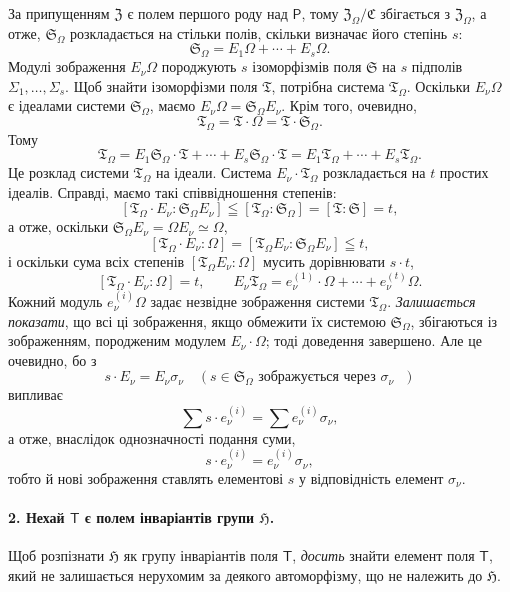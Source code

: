 \documentclass[11pt]{article}
\begin{document}
За припущенням \(\mathfrak Z\) є полем першого роду над \(\mathsf P\), тому \(\mathfrak Z_\Omega/\mathfrak C\) збігається з \(\mathfrak Z_\Omega\), а отже, \(\mathfrak S_\Omega\) розкладається на стільки полів, скільки визначає його степінь \(s\):
\[
\mathfrak S_\Omega = E_1\Omega+\cdots+E_s\Omega .
\]
Модулі зображення \(E_\nu\Omega\) породжують \(s\) ізоморфізмів поля \(\mathfrak S\) на \(s\) підполів \(\Sigma_1,\ldots,\Sigma_s\). Щоб знайти ізоморфізми поля \(\mathfrak T\), потрібна система \(\mathfrak T_\Omega\). Оскільки \(E_\nu\Omega\) є ідеалами системи \(\mathfrak S_\Omega\), маємо \(E_\nu\Omega=\mathfrak S_\Omega E_\nu\). Крім того, очевидно,
\[
\mathfrak T_\Omega=\mathfrak T\cdot\Omega=\mathfrak T\cdot\mathfrak S_\Omega .
\]
Тому
\[
\mathfrak T_\Omega
=E_1\mathfrak S_\Omega\cdot\mathfrak T+\cdots+E_s\mathfrak S_\Omega\cdot\mathfrak T
=E_1\mathfrak T_\Omega+\cdots+E_s\mathfrak T_\Omega .
\]
Це розклад системи \(\mathfrak T_\Omega\) на ідеали. Система \(E_\nu\cdot\mathfrak T_\Omega\) розкладається на \(t\) простих ідеалів. Справді, маємо такі співвідношення степенів:
\[
[\mathfrak T_\Omega\cdot E_\nu:\mathfrak S_\Omega E_\nu]
\leqq [\mathfrak T_\Omega:\mathfrak S_\Omega]=[\mathfrak T:\mathfrak S]=t,
\]
а отже, оскільки \(\mathfrak S_\Omega E_\nu=\Omega E_\nu\simeq\Omega\),
\[
[\mathfrak T_\Omega\cdot E_\nu:\Omega]
=[\mathfrak T_\Omega E_\nu:\mathfrak S_\Omega E_\nu]\leqq t,
\]
і оскільки сума всіх степенів \([\mathfrak T_\Omega E_\nu:\Omega]\) мусить дорівнювати \(s\cdot t\),
\[
[\mathfrak T_\Omega\cdot E_\nu:\Omega]=t,\qquad
E_\nu\mathfrak T_\Omega=e_\nu^{(1)}\cdot\Omega+\cdots+e_\nu^{(t)}\Omega .
\]
Кожний модуль \(e_\nu^{(i)}\Omega\) задає незвідне зображення системи \(\mathfrak T_\Omega\). \emph{Залишається показати}, що всі ці зображення, якщо обмежити їх системою \(\mathfrak S_\Omega\), збігаються із зображенням, породженим модулем \(E_\nu\cdot\Omega\); тоді доведення завершено. Але це очевидно, бо з
\[
s\cdot E_\nu=E_\nu\sigma_\nu\quad
(s\in\mathfrak S_\Omega\text{ зображується через }\sigma_\nu\text{ })
\]
випливає
\[
\sum s\cdot e_\nu^{(i)}=\sum e_\nu^{(i)}\sigma_\nu,
\]
а отже, внаслідок однозначності подання суми,
\[
s\cdot e_\nu^{(i)}=e_\nu^{(i)}\sigma_\nu,
\]
тобто й нові зображення ставлять елементові \(s\) у відповідність елемент \(\sigma_\nu\).

\paragraph{2. Нехай \(\mathsf T\) є полем інваріантів групи \(\mathfrak H\).}
Щоб розпізнати \(\mathfrak H\) як групу інваріантів поля \(\mathsf T\), \emph{досить} знайти елемент поля \(\mathsf T\), який не залишається нерухомим за деякого автоморфізму, що не належить до \(\mathfrak H\).
\end{document}
